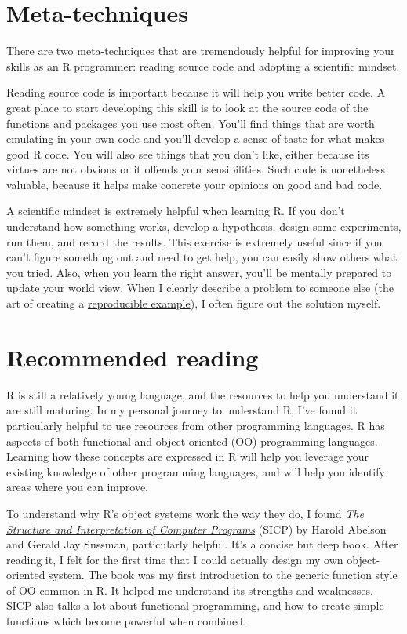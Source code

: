 \hypertarget{meta-techniques}{%
\section{Meta-techniques}\label{meta-techniques}}

There are two meta-techniques that are tremendously helpful for
improving your skills as an R programmer: reading source code and
adopting a scientific mindset.

Reading source code is important because it will help you write better
code. A great place to start developing this skill is to look at the
source code of the functions and packages you use most often. You'll
find things that are worth emulating in your own code and you'll develop
a sense of taste for what makes good R code. You will also see things
that you don't like, either because its virtues are not obvious or it
offends your sensibilities. Such code is nonetheless valuable, because
it helps make concrete your opinions on good and bad code.

A scientific mindset is extremely helpful when learning R. If you don't
understand how something works, develop a hypothesis, design some
experiments, run them, and record the results. This exercise is
extremely useful since if you can't figure something out and need to get
help, you can easily show others what you tried. Also, when you learn
the right answer, you'll be mentally prepared to update your world view.
When I clearly describe a problem to someone else (the art of creating a
\href{http://stackoverflow.com/questions/5963269}{reproducible
example}), I often figure out the solution myself.

\hypertarget{recommended-reading}{%
\section{Recommended reading}\label{recommended-reading}}

R is still a relatively young language, and the resources to help you
understand it are still maturing. In my personal journey to understand
R, I've found it particularly helpful to use resources from other
programming languages. R has aspects of both functional and
object-oriented (OO) programming languages. Learning how these concepts
are expressed in R will help you leverage your existing knowledge of
other programming languages, and will help you identify areas where you
can improve.

To understand why R's object systems work the way they do, I found
\href{http://mitpress.mit.edu/sicp/full-text/book/book.html}{\emph{The
Structure and Interpretation of Computer Programs}} (SICP) by Harold
Abelson and Gerald Jay Sussman, particularly helpful. It's a concise but
deep book. After reading it, I felt for the first time that I could
actually design my own object-oriented system. The book was my first
introduction to the generic function style of OO common in R. It helped
me understand its strengths and weaknesses. SICP also talks a lot about
functional programming, and how to create simple functions which become
powerful when combined.

